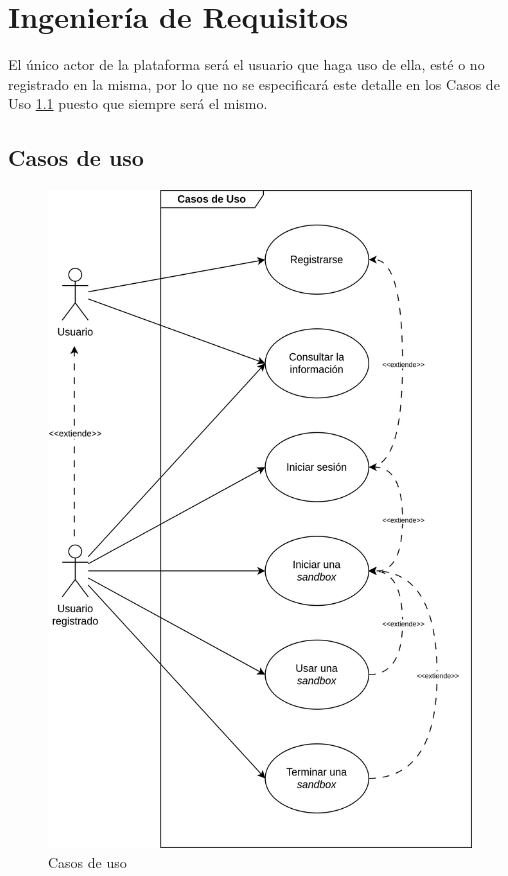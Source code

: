     \section{Ingeniería de Requisitos}
        \label{cap:ingenieria-requisitos}
        
        El único actor de la plataforma será el usuario que haga uso de ella, esté o no registrado en la misma, por lo que no se especificará este detalle en los Casos de Uso \ref{sec:casos-uso} puesto que siempre será el mismo.
        
        \subsection{Casos de uso}
            \label{sec:casos-uso}
            
            \begin{figure}[h]
                \centering

                \includegraphics[scale=0.125]{images/Diagramas/Casos de uso.png}

                \caption{Casos de uso}
                \label{fig:casos-uso}
            \end{figure}
            
